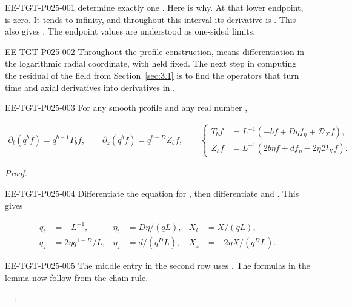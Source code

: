 %
\begin{EESegment}{EE-TGT-P025-001}
determine exactly one . Here is why. At that
lower endpoint,  is zero. It tends to
infinity, and throughout this interval its derivative is
. This also gives
. The endpoint values
 are understood as one-sided limits.
\end{EESegment}

\begin{EESegment}{EE-TGT-P025-002}
Throughout the profile construction,
 means differentiation in the
logarithmic radial coordinate, with  held fixed. The
next step in computing the residual of the field from
Section~\ref{sec:3.1} is to find the operators that turn time and axial
derivatives into derivatives in .
\end{EESegment}

\begin{lemma}\label{lem:4.1}
\begin{EESegment}{EE-TGT-P025-003}
For any smooth profile  and any real number
,
\end{EESegment}
\begin{equation}
\begin{gathered}
 \partial_t(q^bf)=q^{b-1}T_bf,\qquad
 \partial_z(q^bf)=q^{b-D}Z_bf,\qquad
 \left\{
 \begin{aligned}
 T_bf&=L^{-1}(-bf+D\eta f_\eta+\mathcal D_Xf),\\
 Z_bf&=L^{-1}(2b\eta f+df_\eta-2\eta \mathcal D_Xf).
 \end{aligned}
 \right.
\end{gathered}
\tag{4.2}\label{eq:4.2}
\end{equation}
\end{lemma}

\begin{proof}
\begin{EESegment}{EE-TGT-P025-004}
Differentiate the equation for , then differentiate
 and
. This gives
\end{EESegment}
\[
\begin{aligned}
 q_t&=-L^{-1},& \eta_t&=D\eta/(qL),& X_t&=X/(qL),\\
 q_z&=2\eta q^{1-D}/L,& \eta_z&=d/(q^DL),& X_z&=-2\eta X/(q^DL).
\end{aligned}
\]
\begin{EESegment}{EE-TGT-P025-005}
The middle entry in the second row uses
. The formulas in the lemma now follow from
the chain rule.
\end{EESegment}
\end{proof}


